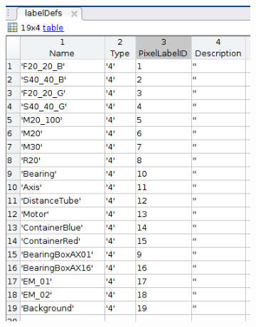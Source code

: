 	\begin{figure}
		\begin{subfigure}{.5\textwidth}
			\centering
			\includegraphics[width=1\linewidth]{images/labelDef}
			\caption{}
			\label{Fig:labeldef}
		\end{subfigure}
		\begin{subfigure}{.5\textwidth}
			\centering

\end{subfigure}
\end{figure}
